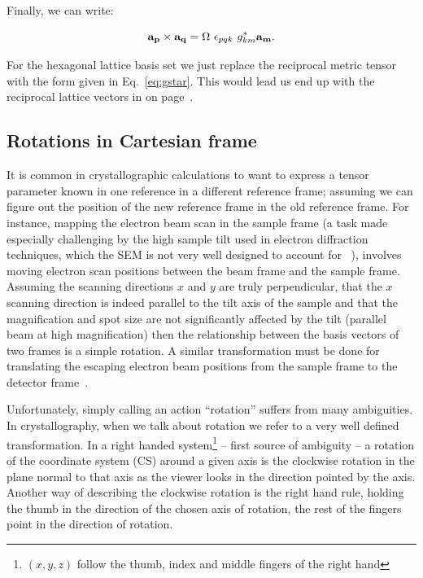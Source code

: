 Finally, we can write: 

\begin{equation*}
\vb{a_p} \times \vb{a_q} = \Omega \,\, \epsilon_{pqk}\, \,  g^*_{km} \vb{a_m}.
\end{equation*}

For the hexagonal lattice basis set we just replace the reciprocal metric tensor with the form given in Eq.~\ref{eq:gstar}. This would lead us end up with the reciprocal lattice vectors in on page~\pageref{eq:3recvectors}.

\subsection{Rotations in Cartesian frame}
\label{subchap:basicRot}
It is common in crystallographic calculations to want to express a tensor parameter known in one reference in a different reference frame; assuming we can figure out the position of the new reference frame in the old reference frame. For instance, mapping the electron beam scan in the sample frame (a task made especially challenging by the high sample tilt used in electron diffraction techniques, which the SEM is not very well designed to account for ~\cite{Nolze07}), involves moving electron scan positions between the beam frame and the sample frame. Assuming the scanning directions $x$ and $y$ are truly perpendicular, that the $x$ scanning direction is indeed parallel to the tilt axis of the sample and that the magnification and spot size are not significantly affected by the tilt (\ie parallel beam at high magnification) then the relationship between the basis vectors of two frames is a simple rotation. A similar transformation must be done for translating the escaping electron beam positions from the sample frame to the detector frame~\cite{Britton16}. 

Unfortunately, simply calling an action ``rotation'' suffers from many ambiguities. In crystallography, when we talk about rotation we refer to a very well defined transformation. In a right handed system\footnote{ $(x, y, z)$ follow the thumb, index and middle fingers of the right hand} -- first source of ambiguity -- a rotation of the coordinate system (CS) around a given axis is the clockwise rotation in the plane normal to that axis as the viewer looks in the direction pointed by the axis. Another way of describing the clockwise rotation is the right hand rule, \ie holding the thumb in the direction of the chosen axis of rotation, the rest of the fingers point in the direction of rotation. 

